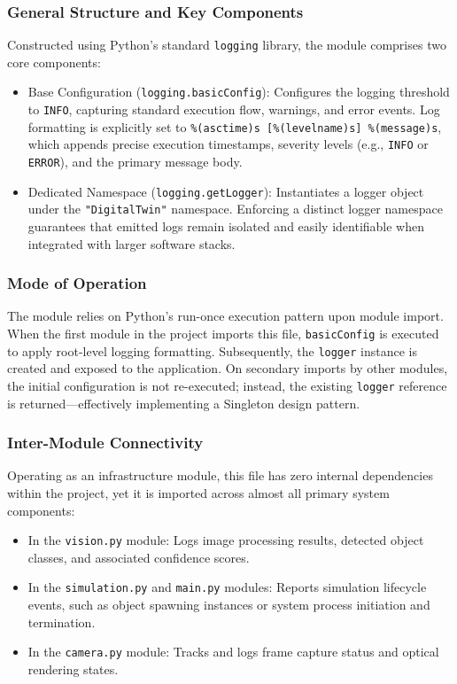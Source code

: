 \documentclass{article}
\begin{document}
\subsubsection{General Structure and Key Components}
Constructed using Python's standard \texttt{logging} library, the module comprises two core components:

\begin{itemize}
	\item Base Configuration (\texttt{logging.basicConfig}): Configures the logging threshold to \texttt{INFO}, capturing standard execution flow, warnings, and error events. Log formatting is explicitly set to \texttt{\%(asctime)s [\%(levelname)s] \%(message)s}, which appends precise execution timestamps, severity levels (e.g., \texttt{INFO} or \texttt{ERROR}), and the primary message body.
	
	\item Dedicated Namespace (\texttt{logging.getLogger}): Instantiates a logger object under the \texttt{"DigitalTwin"} namespace. Enforcing a distinct logger namespace guarantees that emitted logs remain isolated and easily identifiable when integrated with larger software stacks.
\end{itemize}

\subsubsection{Mode of Operation}
The module relies on Python's run-once execution pattern upon module import. When the first module in the project imports this file, \texttt{basicConfig} is executed to apply root-level logging formatting. Subsequently, the \texttt{logger} instance is created and exposed to the application. On secondary imports by other modules, the initial configuration is not re-executed; instead, the existing \texttt{logger} reference is returned—effectively implementing a Singleton design pattern.

\subsubsection{Inter-Module Connectivity}
Operating as an infrastructure module, this file has zero internal dependencies within the project, yet it is imported across almost all primary system components:

\begin{itemize}
	\item In the \texttt{vision.py} module: Logs image processing results, detected object classes, and associated confidence scores.
	\item In the \texttt{simulation.py} and \texttt{main.py} modules: Reports simulation lifecycle events, such as object spawning instances or system process initiation and termination.
	\item In the \texttt{camera.py} module: Tracks and logs frame capture status and optical rendering states.
\end{itemize}
\end{document}
